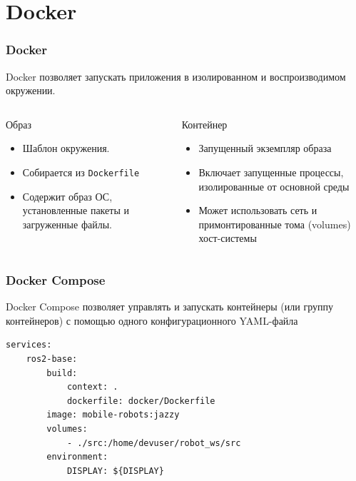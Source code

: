 \documentclass[aspectratio=169]{beamer}
\newcommand{\term}[1]{{\large\textcolor{HSEblue}{#1}}}
\newcommand{\cmd}[1]{\texttt{#1}}
\begin{document}
\section{Docker}

\begin{frame}
\frametitle{Docker}
\term{Docker} позволяет запускать приложения в изолированном и воспроизводимом окружении.
\vfill
\begin{columns}[T]
\begin{block}{Образ}
	\begin{itemize}
	\item Шаблон окружения.
	\item Собирается из \cmd{Dockerfile}
	\item Содержит образ ОС, установленные пакеты и загруженные файлы.
\end{itemize}
\end{block}
\begin{block}{Контейнер}
\begin{itemize}
	\item Запущенный экземпляр образа
	\item Включает запущенные процессы, изолированные от основной среды
	\item Может использовать сеть и примонтированные тома (volumes) хост-системы
\end{itemize}
\end{block}
\end{columns}
\end{frame}

\begin{frame}[fragile]
\frametitle{Docker Compose}
\vfill
\term{Docker Compose} позволяет управлять и запускать контейнеры  (или группу контейнеров) с помощью одного конфигурационного YAML-файла
\vfill
\begin{center}
	\begin{minipage}{0.7\textwidth}
\begin{lstlisting}
services:
    ros2-base:
        build:
            context: .
            dockerfile: docker/Dockerfile
        image: mobile-robots:jazzy
        volumes:
            - ./src:/home/devuser/robot_ws/src
        environment:
            DISPLAY: ${DISPLAY}
\end{lstlisting}
  \end{minipage}
\end{center}
\end{frame}
\end{document}
